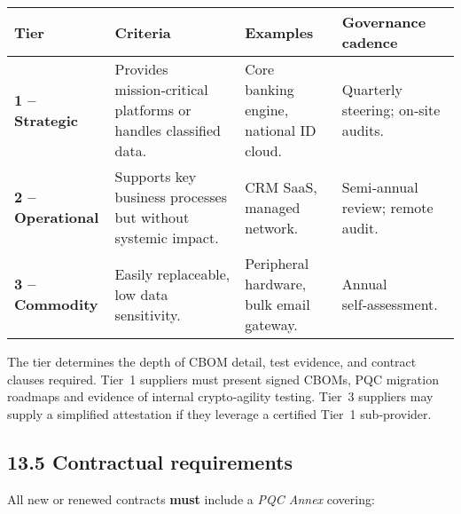 \documentclass[
  english,
]{article}
\begin{document}
\begin{longtable}[]{@{}
  >{\raggedright\arraybackslash}p{}
  >{\raggedright\arraybackslash}p{}
  >{\raggedright\arraybackslash}p{}
  >{\raggedright\arraybackslash}p{}@{}}
\toprule\noalign{}
\begin{minipage}[b]{\linewidth}\raggedright
Tier
\end{minipage} & \begin{minipage}[b]{\linewidth}\raggedright
Criteria
\end{minipage} & \begin{minipage}[b]{\linewidth}\raggedright
Examples
\end{minipage} & \begin{minipage}[b]{\linewidth}\raggedright
Governance cadence
\end{minipage} \\
\midrule\noalign{}
\endhead
\bottomrule\noalign{}
\endlastfoot
\textbf{1 -- Strategic} & Provides mission‑critical platforms or handles
classified data. & Core banking engine, national ID cloud. & Quarterly
steering; on‑site audits. \\
\textbf{2 -- Operational} & Supports key business processes but without
systemic impact. & CRM SaaS, managed network. & Semi‑annual review;
remote audit. \\
\textbf{3 -- Commodity} & Easily replaceable, low data sensitivity. &
Peripheral hardware, bulk email gateway. & Annual self‑assessment. \\
\end{longtable}

The tier determines the depth of CBOM detail, test evidence, and
contract clauses required. Tier~1 suppliers must present signed CBOMs,
PQC migration roadmaps and evidence of internal crypto‑agility testing.
Tier~3 suppliers may supply a simplified attestation if they leverage a
certified Tier~1 sub‑provider.

\subsection{13.5 Contractual
requirements}\label{contractual-requirements}

All new or renewed contracts \textbf{must} include a \emph{PQC Annex}
covering:
\end{document}

